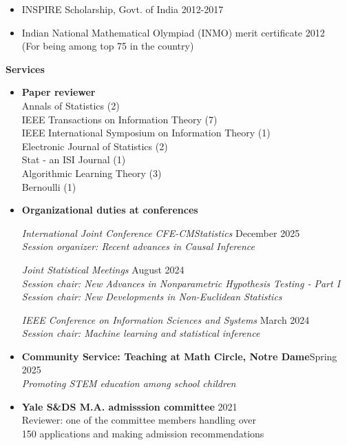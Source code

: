 \documentclass[letterpaper,12pt,oneside]{article}
\theoremstyle{definition}
\begin{document}
			\begin{itemize}
				\item [] INSPIRE Scholarship, Govt. of India \hfill 2012-2017
				\item [] Indian National Mathematical Olympiad (INMO) merit certificate \hfill 2012\\
				(For being among top 75 in the country)
			\end{itemize}
			
			
			\noindent \textbf{Services}
			\begin{itemize}
				\item[]
				{\bf Paper reviewer}\\
				Annals of Statistics (2)\\
				IEEE Transactions on Information Theory (7)\\
				IEEE International Symposium on Information Theory (1)\\
				Electronic Journal of Statistics (2)\\
				Stat - an ISI Journal (1)\\
				Algorithmic Learning Theory (3)\\
				Bernoulli (1)
				
				\item[] 
				{\bf Organizational duties at conferences}
				
				{\it International Joint Conference CFE-CMStatistics} \hfill December 2025\\
				{\it Session organizer: Recent advances in Causal Inference}
				
				{\it Joint Statistical Meetings} \hfill August 2024\\
				{\it Session chair: New Advances in Nonparametric Hypothesis Testing - Part I}\\
				{\it Session chair: New Developments in Non-Euclidean Statistics}
				
				{\it IEEE Conference on Information Sciences and Systems} \hfill March 2024\\
				{\it  Session chair: Machine learning and statistical inference}
				
				\item[] \textbf{Community Service: Teaching at Math Circle, Notre Dame}\hfill Spring 2025\\
				{\it Promoting STEM education among school children}
				
				
				\item[] {\bf Yale S\&DS M.A. admisssion committee} \hfill 2021\\
				Reviewer: one of the committee members
				handling over\\ 150 applications
				and making admission recommendations
				

\end{itemize}
\end{document}
